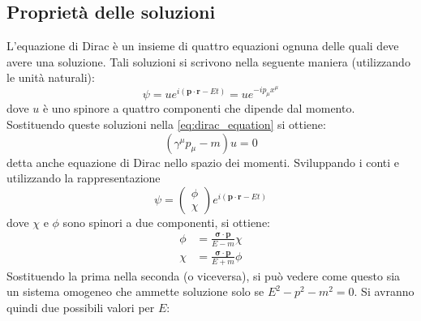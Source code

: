 \documentclass{subnucbo}
\begin{document}
                \subsection{Proprietà delle soluzioni}
                L'equazione di Dirac è un insieme di quattro equazioni ognuna delle quali deve avere una soluzione.
                Tali soluzioni si scrivono nella seguente maniera (utilizzando le unità naturali):
                \begin{equation}
                        \psi = u e ^ { i ( \mathbf { p } \cdot \mathbf { r } - E t ) } = u e ^ { - i p _ { \mu } x ^ { \mu } }
                        \label{eq:dirac_sol}
                \end{equation}
                dove $u$ è uno spinore a quattro componenti che dipende dal momento. Sostituendo queste soluzioni nella \ref{eq:dirac_equation} si ottiene:
                \begin{equation}
                        \left( \gamma ^ { \mu } p _ { \mu } - m \right) u = 0
                        \label{eq:dirac_eq_momentum}
                \end{equation}
                detta anche equazione di Dirac nello spazio dei momenti. Sviluppando i conti e utilizzando la rappresentazione
                \begin{equation}
                        \psi = \left( \begin{array} { l } { \phi } \\ { \chi } \end{array} \right) e ^ { i ( \mathbf { p } \cdot \mathbf { r } - E t ) }
                        \label{eq:dirac_sol_spinors}
                \end{equation}
                dove $\chi$ e $\phi$ sono spinori a due componenti, si ottiene:
                \begin{subequations}
                        \begin{align}
                                \phi & = \frac { \boldsymbol { \sigma } \cdot \mathbf { p } } { E - m } \chi \\
                                \chi & = \frac { \boldsymbol { \sigma } \cdot \mathbf { p } } { E + m } \phi
                        \end{align}
                        \label{eq:phi_chi}
                \end{subequations}
                Sostituendo la prima nella seconda (o viceversa), si può vedere come questo sia un sistema omogeneo che ammette soluzione solo se $E^{2} - p ^ { 2 } - m ^ { 2 } = 0$. Si avranno quindi due possibili valori per $E$:
\end{document}
